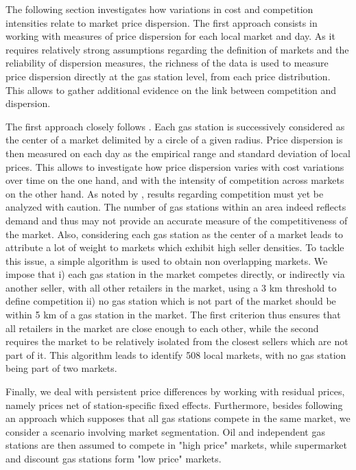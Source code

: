 \documentclass[english]{article}
\begin{document}
The following section investigates how variations in cost and competition intensities relate to market price dispersion. The first approach consists in working with measures of price dispersion for each local market and day. As it requires relatively strong assumptions regarding the definition of markets and the reliability of dispersion measures, the richness of the data is used to measure price dispersion directly at the gas station level, from each price distribution. This allows to gather additional evidence on the link between competition and dispersion.

The first approach closely follows \cite{TAP11}. Each gas station is successively considered as the center of a market delimited by a circle of a given radius. Price dispersion is then measured on each day as the empirical range and standard deviation of local prices. This allows to investigate how price dispersion varies with cost variations over time on the one hand, and with the intensity of competition across markets on the other hand. As noted by \cite{TAP11}, results regarding competition must yet be analyzed with caution. The number of gas stations within an area indeed reflects demand and thus may not provide an accurate measure of the competitiveness of the market. Also, considering each gas station as the center of a market leads to attribute a lot of weight to markets which exhibit high seller densities. To tackle this issue, a simple algorithm is used to obtain non overlapping markets. We impose that i) each gas station in the market competes directly, or indirectly via another seller, with all other retailers in the market, using a 3 km threshold to define competition ii) no gas station which is not part of the market should be within 5 km of a gas station in the market. The first criterion thus ensures that all retailers in the market are close enough to each other, while the second requires the market to be relatively isolated from the closest sellers which are not part of it. This algorithm leads to identify 508 local markets, with no gas station being part of two markets.

Finally, we deal with persistent price differences by working with residual prices, namely prices net of station-specific fixed effects. Furthermore, besides following an approach which supposes that all gas stations compete in the same market, we consider a scenario involving market segmentation. Oil and independent gas stations are then assumed to compete in "high price" markets, while supermarket and discount gas stations form "low price" markets.
\end{document}
